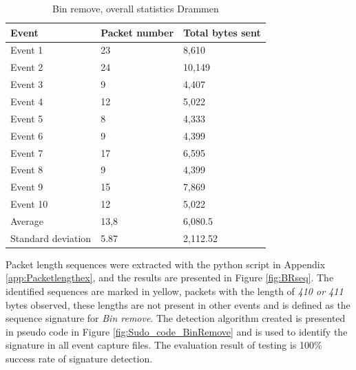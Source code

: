 \begin{table}[H]
\centering
\caption{Bin remove, overall statistics Drammen }
\label{tab:BRoverallDRA}
\begin{tabular}{|l|l|l|}
\hline
\textbf{Event} & \textbf{Packet number} & \textbf{Total bytes sent} \\ \hline
Event 1        & 23                     & 8,610                      \\ \hline
Event 2        & 24                     & 10,149                     \\ \hline
Event 3        & 9                      & 4,407                      \\ \hline
Event 4        & 12                     & 5,022                      \\ \hline
Event 5        & 8                      & 4,333                      \\ \hline
Event 6        & 9                      & 4,399                      \\ \hline
Event 7        & 17                     & 6,595                      \\ \hline
Event 8        & 9                      & 4,399                      \\ \hline
Event 9        & 15                     & 7,869                      \\ \hline
Event 10       & 12                     & 5,022                      \\ \hline
Average        & 13,8                   & 6,080.5                    \\ \hline
Standard deviation        & 5.87
       & 2,112.52               \\ \hline
\end{tabular}
\end{table}

Packet length sequences were extracted with the python script in Appendix \ref{app:Packetlengthex}, and the results are presented in Figure \ref{fig:BRseq}. The identified sequences are marked in yellow, packets with the length of \textit{410 or 411} bytes observed, these lengths are not present in other events and is defined as the sequence signature for \textit{Bin remove}. The detection algorithm created is presented in pseudo code in Figure \ref{fig:Sudo_code_BinRemove} and is used to identify the signature in all event capture files. The evaluation result of testing is 100\% success rate of signature detection.   

